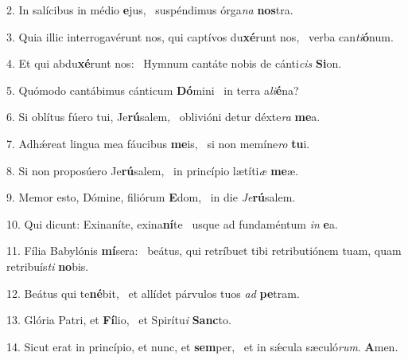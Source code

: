 2. In salícibus in médio \textbf{e}jus, \ast\  suspéndimus órga\textit{na} \textbf{nos}tra.\

3. Quia illic interrogavérunt nos, qui captívos du\textbf{xé}runt nos, \ast\  verba can\textit{ti}\textbf{ó}num.\

4. Et qui abdu\textbf{xé}runt nos: \ast\  Hymnum cantáte nobis de cánti\textit{cis} \textbf{Si}on.\

5. Quómodo cantábimus cánticum \textbf{Dó}mini \ast\  in terra a\textit{li}\textbf{é}na?\

6. Si oblítus fúero tui, Je\textbf{rú}salem, \ast\  oblivióni detur déxte\textit{ra} \textbf{me}a.\

7. Adhǽreat lingua mea fáucibus \textbf{me}is, \ast\  si non memíne\textit{ro} \textbf{tu}i.\

8. Si non proposúero Je\textbf{rú}salem, \ast\  in princípio lætíti\textit{æ} \textbf{me}æ.\

9. Memor esto, Dómine, filiórum \textbf{E}dom, \ast\  in die \textit{Je}\textbf{rú}salem.\

10. Qui dicunt: Exinaníte, exina\textbf{ní}te \ast\  usque ad fundaméntum \textit{in} \textbf{e}a.\

11. Fília Babylónis \textbf{mí}sera: \ast\  beátus, qui retríbuet tibi retributiónem tuam, quam retribuís\textit{ti} \textbf{no}bis.\

12. Beátus qui te\textbf{né}bit, \ast\  et allídet párvulos tuos \textit{ad} \textbf{pe}tram.\

13. Glória Patri, et \textbf{Fí}lio, \ast\  et Spirítu\textit{i} \textbf{Sanc}to.\

14. Sicut erat in princípio, et nunc, et \textbf{sem}per, \ast\  et in sǽcula sæculó\textit{rum}. \textbf{A}men.\


